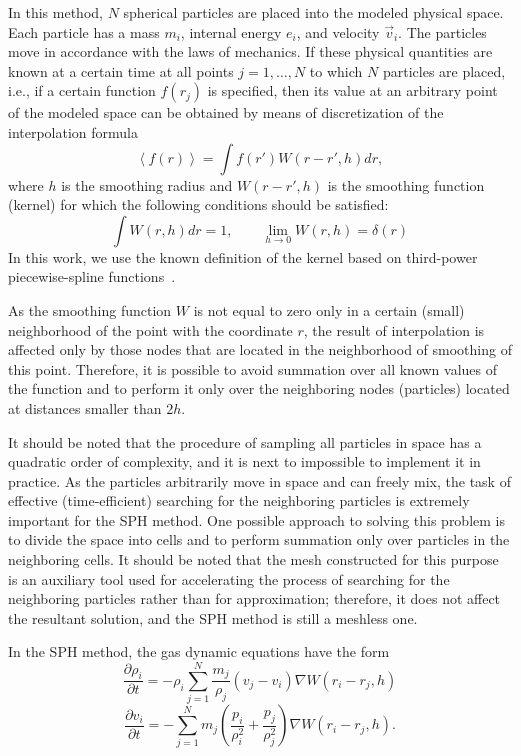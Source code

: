 \documentclass[a4paper]{jpconf}
\begin{document}
In this method, $N$ spherical particles are placed into the modeled physical space. Each particle has a
mass $m_i$, internal energy $e_i$, and velocity $\vec{v}_i$. The particles move in accordance with the laws of mechanics. If these
physical quantities are known at a certain time at all points $j = 1,\ldots{},N$ to which $N$ particles are placed, i.e., if
a certain function $f(r_j)$ is specified, then its value at an arbitrary point of the modeled space can be obtained by
means of discretization of the interpolation formula
\[ \left\langle f(r) \right\rangle = \int f(r') W(r-r', h) dr,\]
where $h$ is the smoothing radius and $W(r-r', h)$ is the smoothing function (kernel) for which the following conditions
should be satisfied:
\[ \int W(r,h) dr = 1, \qquad   \lim_{h \to 0} W(r,h)=\delta(r)\]
In this work, we use the known definition of the kernel based on third-power piecewise-spline functions~\cite{Monaghan1992}.	

As the smoothing function $W$ is not equal to zero only in a certain (small) neighborhood of the point with the
coordinate $r$, the result of interpolation is affected only by those nodes that are located in the neighborhood of
smoothing of this point. Therefore, it is possible to avoid summation over all known values of the function and to
perform it only over the neighboring nodes (particles) located at distances smaller than $2h$.

It should be noted that the procedure of sampling all particles in space has a quadratic order of complexity,
and it is next to impossible to implement it in practice. As the particles arbitrarily move in space and can freely
mix, the task of effective (time-efficient) searching for the neighboring particles is extremely important for the
SPH method. One possible approach to solving this problem is to divide the space into cells and to perform
summation only over particles in the neighboring cells. It should be noted that the mesh constructed for this
purpose is an auxiliary tool used for accelerating the process of searching for the neighboring particles rather than
for approximation; therefore, it does not affect the resultant solution, and the SPH method is still a meshless one.
	
	In the SPH method, the gas dynamic equations have the form
	\[  \frac{\partial \rho_i}{\partial t} = - \rho_i \sum\limits_{j=1}^{N} \frac{m_j}{\rho_j} (v_j -  v_i) \nabla W(r_i - r_j,h)
\]
\[\frac{\partial v_i}{\partial t} = - \sum\limits_{j=1}^{N} m_j \left ( \frac{p_i}{\rho_i^2} + \frac{p_j}{\rho_j^2} \right) \nabla W(r_i-r_j,h).\]
\end{document}
